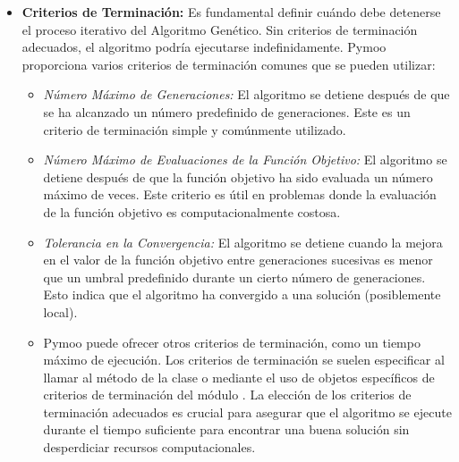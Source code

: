 \begin{itemize}[label=\textbullet, leftmargin=*]
    \item \textbf{Criterios de Terminación:} Es fundamental definir cuándo debe detenerse el proceso iterativo del Algoritmo Genético. Sin criterios de terminación adecuados, el algoritmo podría ejecutarse indefinidamente. Pymoo proporciona varios criterios de terminación comunes que se pueden utilizar:
    \begin{itemize}[label=\textbullet, leftmargin=*] %
        \item \textit{Número Máximo de Generaciones:} El algoritmo se detiene después de que se ha alcanzado un número predefinido de generaciones. Este es un criterio de terminación simple y comúnmente utilizado.
        \item \textit{Número Máximo de Evaluaciones de la Función Objetivo:} El algoritmo se detiene después de que la función objetivo ha sido evaluada un número máximo de veces. Este criterio es útil en problemas donde la evaluación de la función objetivo es computacionalmente costosa.
        \item \textit{Tolerancia en la Convergencia:} El algoritmo se detiene cuando la mejora en el valor de la función objetivo entre generaciones sucesivas es menor que un umbral predefinido durante un cierto número de generaciones. Esto indica que el algoritmo ha convergido a una solución (posiblemente local).
        \item Pymoo puede ofrecer otros criterios de terminación, como un tiempo máximo de ejecución. Los criterios de terminación se suelen especificar al llamar al método \texttt{} de la clase \texttt{} o mediante el uso de objetos específicos de criterios de terminación del módulo \texttt{}. La elección de los criterios de terminación adecuados es crucial para asegurar que el algoritmo se ejecute durante el tiempo suficiente para encontrar una buena solución sin desperdiciar recursos computacionales.
    \end{itemize}
\end{itemize}

